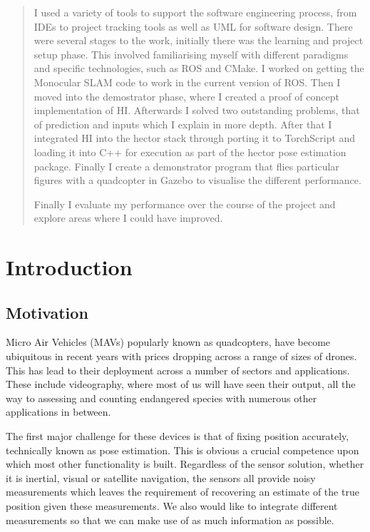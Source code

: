 \documentclass[]{../resources/final_report}
\begin{document}
\begin{abstract}
I used a variety of tools to support the software engineering process, from IDEs to project tracking tools as well 
as UML for software design.
There were several stages to the work, initially there was the learning and project setup phase. This involved 
familiarising myself with different paradigms and specific technologies, such as ROS and CMake. I worked on 
getting the Monocular SLAM code to work in the current version of ROS. Then I moved into the 
demostrator phase, where I created a proof of concept implementation of HI. Afterwards I solved two outstanding problems,
that of prediction and inputs which I explain in more depth. After that I integrated HI into the hector stack through
porting it to TorchScript and loading it into C++ for execution as part of the hector pose estimation package. Finally
I create a demonstrator program that flies particular figures with a quadcopter in Gazebo to visualise the different 
performance.


Finally I evaluate my performance over the course of the project and explore areas where I could have improved.



\end{abstract}
\newpage

\chapter{Introduction}


\section{Motivation}

Micro Air Vehicles (MAVs) popularly known as quadcopters, have become ubiquitous in recent years 
with prices dropping across a range of sizes of drones. This has lead to their deployment across 
a number of sectors and applications. These include videography, where most of us will have seen 
their output, all the way to assessing and counting endangered species with numerous other 
applications in between.

The first major challenge for these devices is that of fixing position accurately, technically known
as pose estimation. This is obvious a crucial competence upon which most other functionality is built.
Regardless of the sensor solution, whether it is inertial, visual or satellite navigation, the sensors 
all provide noisy measurements which leaves the requirement of recovering an estimate of the true position given 
these measurements. We also would like to integrate different measurements so that we can make use of 
as much information as possible. 
\end{document}
